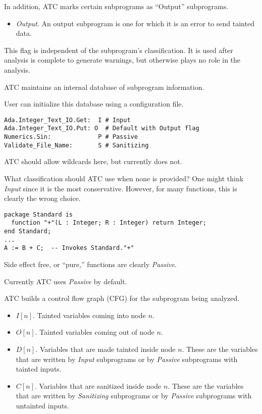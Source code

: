 \documentclass[landscape]{slides}
\begin{document}
\stopslide

In addition, ATC marks certain subprograms as ``Output'' subprograms.
\begin{itemize}
\item \textit{Output}. An output subprogram is one for which it is an error to send tainted
data.
\end{itemize}

This flag is independent of the subprogram's classification. It is used after analysis is
complete to generate warnings, but otherwise plays no role in the analysis.
\stopslide

ATC maintains an internal database of subprogram information.

User can initialize this database using a configuration file.
\begin{verbatim}
Ada.Integer_Text_IO.Get:  I # Input
Ada.Integer_Text_IO.Put: O  # Default with Output flag
Numerics.Sin:             P # Passive
Validate_File_Name:       S # Sanitizing
\end{verbatim}
ATC should allow wildcards here, but currently does not.
\stopslide

What classification should ATC use when none is provided? One might think \textit{Input} since
it is the most conservative. However, for many functions, this is clearly the wrong choice.
\begin{verbatim}
package Standard is
  function "+"(L : Integer; R : Integer) return Integer;
end Standard;
...
A := B + C;  -- Invokes Standard."+"
\end{verbatim}
Side effect free, or ``pure,'' functions are clearly \textit{Passive}.

Currently ATC uses \textit{Passive} by default.
\stopslide

ATC builds a control flow graph (CFG) for the subprogram being analyzed.
\begin{itemize}
\item $I[n]$. Tainted variables coming into node $n$.
\item $O[n]$. Tainted variables coming out of node $n$.
\item $D[n]$. Variables that are made tainted inside node $n$. These are the variables that are
written by \textit{Input} subprograms or by \textit{Passive} subprograms with tainted inputs.
\item $C[n]$. Variables that are sanitized inside node $n$. These are the variables that are
written by \textit{Sanitizing} subprograms or by \textit{Passive} subprograms with untainted
inputs.
\end{itemize}
\stopslide
\end{document}
